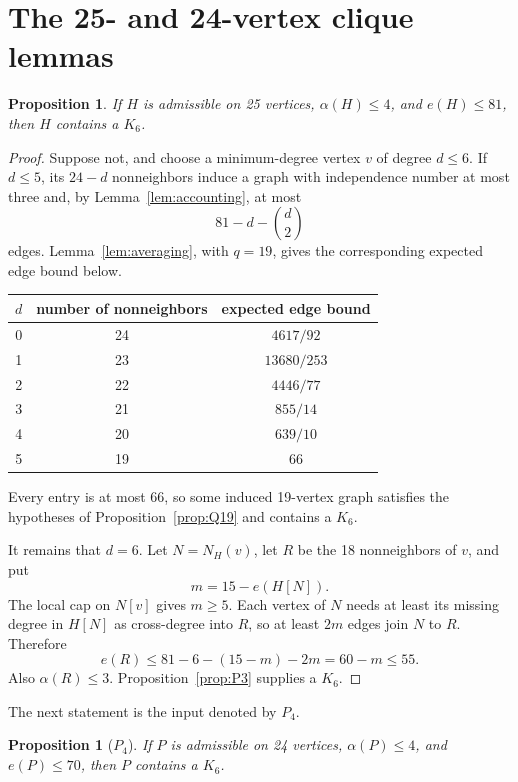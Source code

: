 \documentclass[11pt,reqno,a4paper]{amsart}
\newtheorem{proposition}[theorem]{Proposition}
\theoremstyle{definition}
\theoremstyle{remark}
\begin{document}
\section{The 25- and 24-vertex clique lemmas}

\begin{proposition}\label{prop:H25}
If $H$ is admissible on 25 vertices, $\alpha(H)\leq4$, and $e(H)\leq81$,
then $H$ contains a $K_6$.
\end{proposition}

\begin{proof}
Suppose not, and choose a minimum-degree vertex $v$ of degree $d\leq6$.
If $d\leq5$, its $24-d$ nonneighbors induce a graph with independence
number at most three and, by Lemma~\ref{lem:accounting}, at most
\[
  81-d-\binom d2
\]
edges.  Lemma~\ref{lem:averaging}, with $q=19$, gives the corresponding
expected edge bound below.
\begin{center}
\begin{tabular}{c@{\qquad}c@{\qquad}c}
\toprule
$d$ & number of nonneighbors & expected edge bound\\
\midrule
0 & 24 & $4617/92$\\
1 & 23 & $13680/253$\\
2 & 22 & $4446/77$\\
3 & 21 & $855/14$\\
4 & 20 & $639/10$\\
5 & 19 & $66$\\
\bottomrule
\end{tabular}
\end{center}
Every entry is at most 66, so some induced 19-vertex graph satisfies the
hypotheses of Proposition~\ref{prop:Q19} and contains a $K_6$.

It remains that $d=6$.  Let $N=N_H(v)$, let $R$ be the 18 nonneighbors of
$v$, and put
\[
  m=15-e(H[N]).
\]
The local cap on $N[v]$ gives $m\geq5$.  Each vertex of $N$ needs at least
its missing degree in $H[N]$ as cross-degree into $R$, so at least $2m$
edges join $N$ to $R$.  Therefore
\[
  e(R)\leq81-6-(15-m)-2m=60-m\leq55.
\]
Also $\alpha(R)\leq3$.  Proposition~\ref{prop:P3} supplies a $K_6$.
\end{proof}

The next statement is the input denoted by $P_4$.

\begin{proposition}[$P_4$]\label{prop:P4}
If $P$ is admissible on 24 vertices, $\alpha(P)\leq4$, and $e(P)\leq70$,
then $P$ contains a $K_6$.
\end{proposition}
\end{document}
